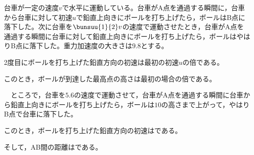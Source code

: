 \hakosyokika
\item
    \begin{mawarikomi}{150pt}{}
        台車が一定の速度$v$で水平に運動している。台車がA点を通過する瞬間に，台車から台車に対して初速$u$で鉛直上向きにボールを打ち上げたら，ボールはB点に落下した。次に台車を$\bunsuu{1}{2}v$の速度で運動させたとき，台車がA点を通過する瞬間に台車に対して鉛直上向きにボールを打ち上げたら，ボールはやはりB点に落下した。重力加速度の大きさは$9.8$とする。
        \begin{Enumerate}
            \item 2度目にボールを打ち上げた鉛直方向の初速は最初の初速$u$の\Hako 倍である。
            \item このとき，ボールが到達した最高点の高さは最初の場合の\Hako 倍である。
        \end{Enumerate}
        ~~ところで，台車を$5.6$の速度で運動させて，台車がA点を通過する瞬間に台車から鉛直上向きにボールを打ち上げたら，ボールは$10$の高さまで上がって，やはりB点で台車に落下した。
        \begin{Enumerate*}
            \item このとき，ボールを打ち上げた鉛直方向の初速は\Hako {}である。
            \item そして，AB間の距離は\Hako {}である。
        \end{Enumerate*}
    \end{mawarikomi}